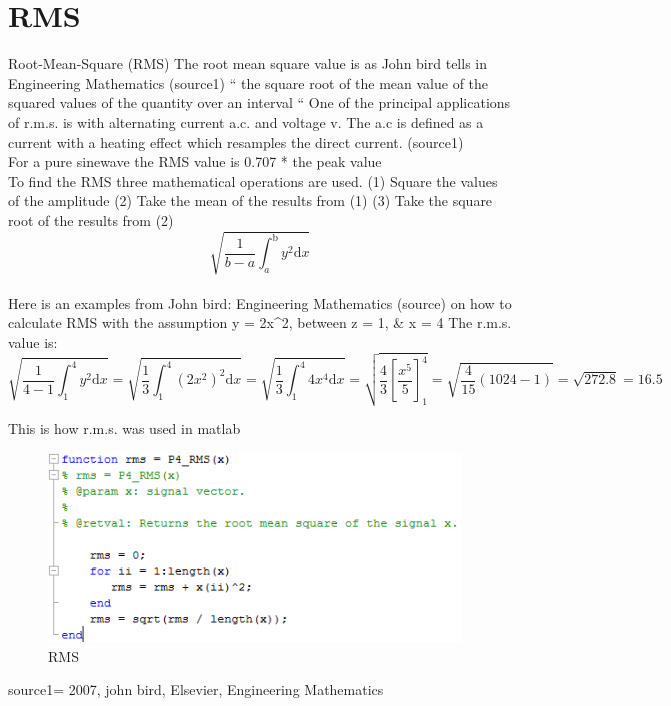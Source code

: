 \section{RMS}


Root-Mean-Square (RMS)
The root mean square value is as John bird tells in Engineering Mathematics (source1) “ the square root of the mean value of the squared values of the quantity over an interval “
One of the principal applications of r.m.s. is with alternating current a.c. and voltage v. The a.c is defined as a current with a heating effect which resamples the direct current. (source1)
\\
For a pure sinewave the RMS value is 0.707 * the peak value
\\
To find the RMS three mathematical operations are used.
(1)	Square the values of the amplitude
(2)	Take the mean of the results from (1)
(3)	Take the square root of the results from (2)
\begin{equation}\label{eq:RMS formular}
\sqrt{\frac{1}{b-a} \int_a^\mathrm{b}y^2\mathrm{d}x}
\end{equation}
\\
Here is an examples from John bird: Engineering Mathematics (source) on how to calculate RMS with the assumption y = 2x^2, between z = 1, & x = 4
The r.m.s. value is:
\\
\begin{equation}\label{eq:RMS formular}
\sqrt{\frac{1}{4-1} \int_1^\mathrm{4}y^2\mathrm{d}x} =
\sqrt{\frac{1}{3} \int_1^\mathrm{4}(2x^2)^2\mathrm{d}x} = 
\sqrt{\frac{1}{3} \int_1^\mathrm{4}4x^4\mathrm{d}x} = 
\sqrt{\frac{4}{3} [\frac{x^5}{5}]_1^4} =
\sqrt{\frac{4}{15} (1024-1)} = 
\sqrt{272.8} = 16.5
\end{equation}

This is how r.m.s. was used in matlab
\begin{figure}
\begin{center}
\includegraphics[height=5cm]{fig/RMS_matlabCode.png}
\caption{RMS}
\end{center}
\end{figure}

source1= 2007, john bird, Elsevier, Engineering Mathematics
